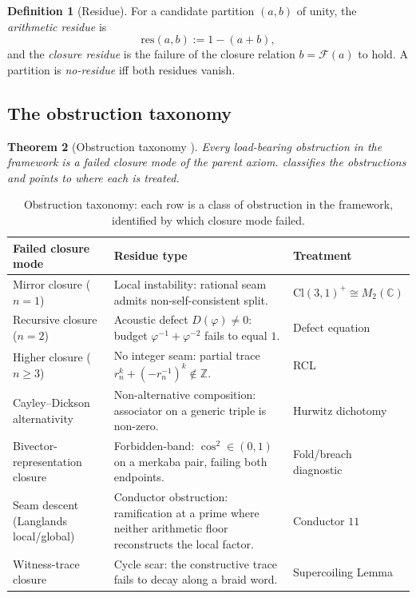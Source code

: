 \documentclass[11pt,a4paper]{article}
\theoremstyle{plain}
\newtheorem{theorem}{Theorem}[section]
\theoremstyle{definition}
\newtheorem{definition}[theorem]{Definition}
\theoremstyle{remark}
\numberwithin{equation}{section}
\providecommand{\Cl}{\mathrm{Cl}}
\providecommand{\C}{\mathbb{C}}
\providecommand{\Z}{\mathbb{Z}}
\providecommand{\vp}{\varphi}
\begin{document}
\begin{definition}[Residue]
\label{def:residue}
For a candidate partition $(a, b)$ of unity, the
\emph{arithmetic residue} is
\[
  \mathrm{res}(a, b) := 1 - (a + b),
\]
and the \emph{closure residue} is the failure of the closure
relation $b = \mathcal{F}(a)$ to hold.  A partition is
\emph{no-residue} iff both residues vanish.
\end{definition}

\subsection{The obstruction taxonomy}

\begin{theorem}[Obstruction taxonomy {\cite{no-residue-parent}}]
\label{thm:obstructions}
Every load-bearing obstruction in the framework is a failed
closure mode of the parent axiom.
 classifies the obstructions and
points to where each is treated.
\end{theorem}

\begin{table}[h]
\centering
\caption{Obstruction taxonomy: each row is a class of obstruction
in the framework, identified by which closure mode failed.}
\label{tab:obstructions-paper3}
\renewcommand{\arraystretch}{1.4}
\small
\begin{tabular}{p{4.0cm} p{6.5cm} p{3.5cm}}
\toprule
\textbf{Failed closure mode} & \textbf{Residue type} &
\textbf{Treatment} \\
\midrule
Mirror closure ($n = 1$) &
  Local instability: rational seam admits non-self-consistent
  split. &
  $\Cl(3,1)^+ \cong M_2(\C)$ \cite{paper-I-substrate} \\
\midrule
Recursive closure ($n = 2$) &
  Acoustic defect $D(\vp) \ne 0$: budget $\vp^{-1} + \vp^{-2}$
  fails to equal $1$. &
  Defect equation \cite{paper-I-substrate,paper-II-proof} \\
\midrule
Higher closure ($n \ge 3$) &
  No integer seam: partial trace $r_n^k + (-r_n^{-1})^k \notin
  \Z$. &
  RCL \cite[Lem.~2.3]{paper-I-substrate} \\
\midrule
Cayley--Dickson alternativity &
  Non-alternative composition: associator on a generic triple is
  non-zero. &
  Hurwitz dichotomy \cite{paper-I-substrate} \\
\midrule
Bivector-representation closure &
  Forbidden-band: $\cos^2 \in (0, 1)$ on a merkaba pair, failing
  both endpoints. &
  Fold/breach diagnostic \cite{paper-I-substrate} \\
\midrule
Seam descent (Langlands local/global) &
  Conductor obstruction: ramification at a prime where neither
  arithmetic floor reconstructs the local factor. &
  Conductor $11$ \cite{paper-II-proof} \\
\midrule
Witness-trace closure &
  Cycle scar: the constructive trace fails to decay along a braid
  word. &
  Supercoiling Lemma \cite{paper-II-proof} \\
\bottomrule
\end{tabular}
\end{table}
\end{document}
